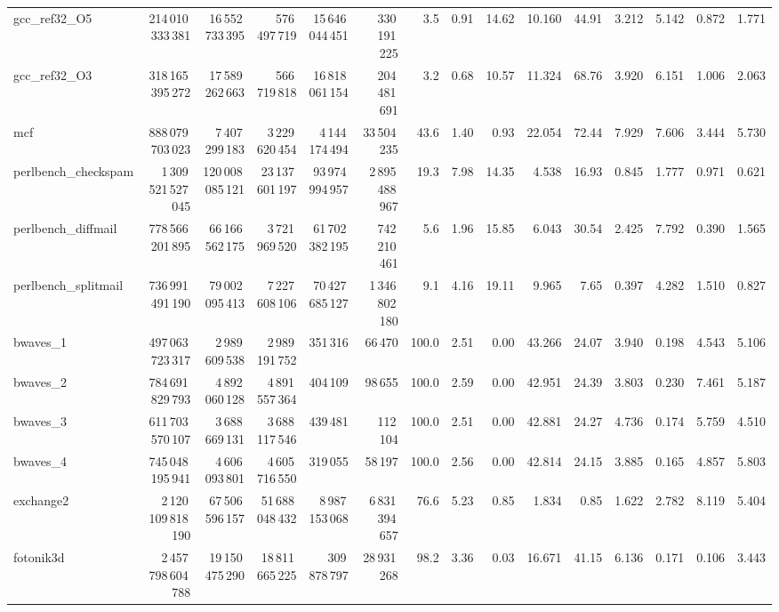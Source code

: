 \documentclass[9pt,landscape,a4paper]{article}
\begin{document}
\begin{adjustbox}{max width=\textwidth, max totalheight=0.50\textheight}
\begin{tabular}{lrrrrrrrrrrrrrr}
gcc\_ref32\_O5 & 214\,010\,333\,381 & 16\,552\,733\,395 & 576\,497\,719 & 15\,646\,044\,451 & 330\,191\,225 & 3.5 & 0.91 & 14.62 & 10.160 & 44.91 & 3.212 & 5.142 & 0.872 & 1.771 \\
gcc\_ref32\_O3 & 318\,165\,395\,272 & 17\,589\,262\,663 & 566\,719\,818 & 16\,818\,061\,154 & 204\,481\,691 & 3.2 & 0.68 & 10.57 & 11.324 & 68.76 & 3.920 & 6.151 & 1.006 & 2.063 \\
mcf & 888\,079\,703\,023 & 7\,407\,299\,183 & 3\,229\,620\,454 & 4\,144\,174\,494 & 33\,504\,235 & 43.6 & 1.40 & 0.93 & 22.054 & 72.44 & 7.929 & 7.606 & 3.444 & 5.730 \\
perlbench\_checkspam & 1\,309\,521\,527\,045 & 120\,008\,085\,121 & 23\,137\,601\,197 & 93\,974\,994\,957 & 2\,895\,488\,967 & 19.3 & 7.98 & 14.35 & 4.538 & 16.93 & 0.845 & 1.777 & 0.971 & 0.621 \\
perlbench\_diffmail & 778\,566\,201\,895 & 66\,166\,562\,175 & 3\,721\,969\,520 & 61\,702\,382\,195 & 742\,210\,461 & 5.6 & 1.96 & 15.85 & 6.043 & 30.54 & 2.425 & 7.792 & 0.390 & 1.565 \\
perlbench\_splitmail & 736\,991\,491\,190 & 79\,002\,095\,413 & 7\,227\,608\,106 & 70\,427\,685\,127 & 1\,346\,802\,180 & 9.1 & 4.16 & 19.11 & 9.965 & 7.65 & 0.397 & 4.282 & 1.510 & 0.827 \\
bwaves\_1 & 497\,063\,723\,317 & 2\,989\,609\,538 & 2\,989\,191\,752 & 351\,316 & 66\,470 & 100.0 & 2.51 & 0.00 & 43.266 & 24.07 & 3.940 & 0.198 & 4.543 & 5.106 \\
bwaves\_2 & 784\,691\,829\,793 & 4\,892\,060\,128 & 4\,891\,557\,364 & 404\,109 & 98\,655 & 100.0 & 2.59 & 0.00 & 42.951 & 24.39 & 3.803 & 0.230 & 7.461 & 5.187 \\
bwaves\_3 & 611\,703\,570\,107 & 3\,688\,669\,131 & 3\,688\,117\,546 & 439\,481 & 112\,104 & 100.0 & 2.51 & 0.00 & 42.881 & 24.27 & 4.736 & 0.174 & 5.759 & 4.510 \\
bwaves\_4 & 745\,048\,195\,941 & 4\,606\,093\,801 & 4\,605\,716\,550 & 319\,055 & 58\,197 & 100.0 & 2.56 & 0.00 & 42.814 & 24.15 & 3.885 & 0.165 & 4.857 & 5.803 \\
exchange2 & 2\,120\,109\,818\,190 & 67\,506\,596\,157 & 51\,688\,048\,432 & 8\,987\,153\,068 & 6\,831\,394\,657 & 76.6 & 5.23 & 0.85 & 1.834 & 0.85 & 1.622 & 2.782 & 8.119 & 5.404 \\
fotonik3d & 2\,457\,798\,604\,788 & 19\,150\,475\,290 & 18\,811\,665\,225 & 309\,878\,797 & 28\,931\,268 & 98.2 & 3.36 & 0.03 & 16.671 & 41.15 & 6.136 & 0.171 & 0.106 & 3.443 \\

\end{tabular}
\end{adjustbox}
\end{document}
